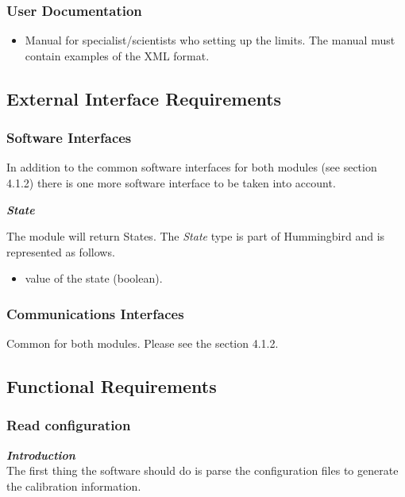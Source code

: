 \subsubsection{User Documentation}
\begin{itemize}
\item Manual for specialist/scientists who setting up the limits. The manual must contain examples of the XML format.
\end{itemize}
\pagebreak
\subsection{External Interface Requirements}

\subsubsection{Software Interfaces}

In addition to the common software interfaces for both modules (see section 4.1.2) there is one more software interface to be taken into account.

\textbf{\emph{State}}

The module will return States. The \emph{State} type is part of Hummingbird and is represented as follows.

\begin{itemize}
\item value of the state (boolean).

\end{itemize}


\subsubsection{Communications Interfaces}

Common for both modules. Please see the section 4.1.2.

\subsection{Functional Requirements}

\subsubsection{Read configuration}

\textbf{\emph{Introduction}}\\
The first thing the software should do is parse the configuration files to generate the calibration information.

